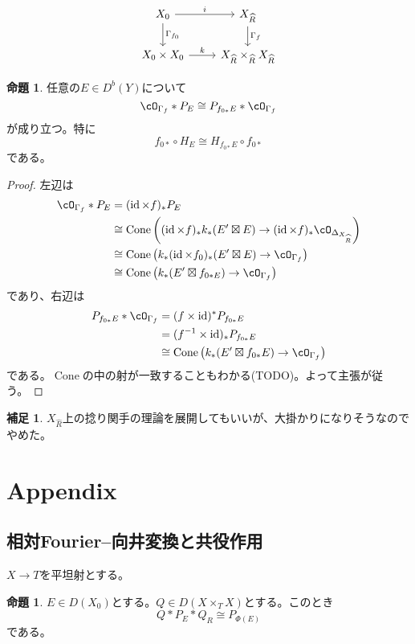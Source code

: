 \documentclass[uplatex, a4paper, dvipdfmx]{jsarticle}
\theoremstyle{definition}
\newtheorem{proposition}[theorem]{命題}
\newtheorem{remark}[theorem]{補足}
\DeclareMathOperator{\Cone}{\mathrm{Cone}}
\DeclareMathOperator{\id}{\mathrm{id}}
\begin{document}
\[
    \begin{tikzcd}
        X_0 \ar[r, "i"] \ar[d, "\Gamma_{f_0}"]& X_{\widehat{R}} \ar[d, "\Gamma_f"]\\
        X_0 \times X_0 \ar[r, "k"]& X_{\widehat{R}} \times_{\widehat{R}} X_{\widehat{R}}
    \end{tikzcd}
\]
\begin{proposition}
    任意の$E \in D^b(Y)$について
    \begin{equation}
        \cO_{\Gamma_f} * P_E \cong P_{f_{0*}E} * \cO_{\Gamma_f}
    \end{equation}
    が成り立つ。特に
    \begin{equation}
        f_{0*}\circ H_E \cong H_{f_{0*}E} \circ f_{0*}
    \end{equation}
    である。
\end{proposition}
\begin{proof}
    左辺は
    \begin{align}
        \cO_{\Gamma_f} * P_E & = (\id \times f)_* P_E                                                                                         \\
                             & \cong \Cone\left((\id \times f)_*k_*(E' \boxtimes E) \to (\id \times f)_*\cO_{\Delta_{X_{\widehat{R}}}}\right) \\
                             & \cong \Cone\left(k_*(\id \times f_0)_*(E' \boxtimes E) \to \cO_{\Gamma_f}\right)                               \\
                             & \cong \Cone\left(k_*(E' \boxtimes f_{0*E}) \to \cO_{\Gamma_f}\right)
    \end{align}
    であり、右辺は
    \begin{align}
        P_{f_{0*}E} * \cO_{\Gamma_f} & = (f \times \id)^*P_{f_{0*}E}                                        \\
                                     & = (f^{-1} \times \id)_*P_{f_{0*}E}                                   \\
                                     & \cong \Cone\left(k_*(E' \boxtimes f_{0*}E) \to \cO_{\Gamma_f}\right)
    \end{align}
    である。$\Cone$の中の射が一致することもわかる(TODO)。よって主張が従う。
\end{proof}
\begin{remark}
    $X_{\widehat{R}}$上の捻り関手の理論を展開してもいいが、大掛かりになりそうなのでやめた。
\end{remark}
\section{Appendix}
\subsection{相対Fourier--向井変換と共役作用}
$X \to T$を平坦射とする。
\begin{proposition}
    $E \in D(X_0)$とする。$Q \in D(X \times_T X)$とする。このとき
    \begin{equation}
        Q * P_E * Q_R \cong P_{\Phi(E)}
    \end{equation}
    である。
\end{proposition}

\printbibliography[title=参考文献]
\end{document}
